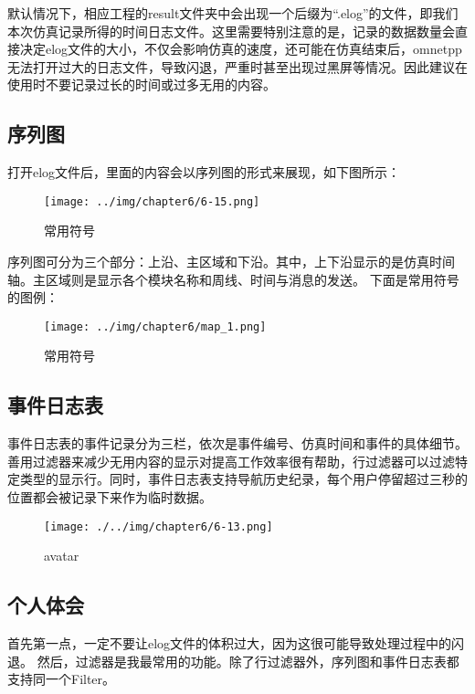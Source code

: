 默认情况下，相应工程的result文件夹中会出现一个后缀为“.elog”的文件，即我们本次仿真记录所得的时间日志文件。这里需要特别注意的是，记录的数据数量会直接决定elog文件的大小，不仅会影响仿真的速度，还可能在仿真结束后，omnetpp无法打开过大的日志文件，导致闪退，严重时甚至出现过黑屏等情况。因此建议在使用时不要记录过长的时间或过多无用的内容。

\subsection{序列图}
\label{序列图}

打开elog文件后，里面的内容会以序列图的形式来展现，如下图所示：

\begin{figure}[htbp]
\centering
\texttt{[image: ../img/chapter6/6-15.png]}
\caption{常用符号}
\end{figure}

序列图可分为三个部分：上沿、主区域和下沿。其中，上下沿显示的是仿真时间轴。主区域则是显示各个模块名称和周线、时间与消息的发送。
下面是常用符号的图例：

\begin{figure}[htbp]
\centering
\texttt{[image: ../img/chapter6/map\_1.png]}
\caption{常用符号}
\end{figure}

\subsection{事件日志表}
\label{事件日志表}

事件日志表的事件记录分为三栏，依次是事件编号、仿真时间和事件的具体细节。
善用过滤器来减少无用内容的显示对提高工作效率很有帮助，行过滤器可以过滤特定类型的显示行。同时，事件日志表支持导航历史纪录，每个用户停留超过三秒的位置都会被记录下来作为临时数据。

\begin{figure}[htbp]
\centering
\texttt{[image: ./../img/chapter6/6-13.png]}
\caption{avatar}
\end{figure}

\subsection{个人体会}
\label{个人体会}

首先第一点，一定不要让elog文件的体积过大，因为这很可能导致处理过程中的闪退。
然后，过滤器是我最常用的功能。除了行过滤器外，序列图和事件日志表都支持同一个Filter。


